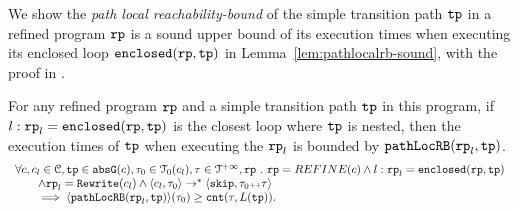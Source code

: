 We show the \emph{path local reachability-bound} of the simple transition path $\mathtt{tp}$ in a refined program $\mathtt{rp}$ is a sound upper bound of its execution times when executing its enclosed loop $\mathtt{enclosed}(\mathtt{rp}, \mathtt{tp})$ in Lemma~\ref{lem:pathlocalrb-sound}, with the proof in .
\begin{lem}
  \label{lem:pathlocalrb-sound}
  For any refined program $\mathtt{rp}$ and a simple transition path $\mathtt{tp}$ in this program,
  if $l: \mathtt{rp}_l = \mathtt{enclosed}(\mathtt{rp}, \mathtt{tp})$ is the closest loop where $\mathtt{tp}$ is nested,
  then the execution times of $\mathtt{tp}$ when executing the $\mathtt{rp}_l$ is bounded by $\mathtt{pathLocRB}(\mathtt{rp}_l, \mathtt{tp})$.
  \[
    \begin{array}{l}
    \forall c, c_l \in \mathcal{C}, \mathtt{tp} \in \mathtt{abs}{\mathtt{G}}(c), \mathtt{\tau}_0 \in \mathcal{T}_0(c_l), \mathtt{\tau} \in \mathcal{T}^{+\infty}, \mathtt{rp} ~.~ 
    \mathtt{rp} = REFINE(c)
    \land
    l: \mathtt{rp}_l = \mathtt{enclosed}(\mathtt{rp}, \mathtt{tp})
    \\ \qquad
    \land 
    \mathtt{rp}_l = \mathtt{Rewrite}(c_l)
    \land
    \langle c_l, \mathtt{\tau}_0 \rangle \to^* 
    \langle \mathtt{skip}, \mathtt{\tau}_0 {\scriptscriptstyle ++} \mathtt{\tau} \rangle
    \\ \qquad
    \implies
    \langle \mathtt{pathLocRB}(\mathtt{rp}_l, \mathtt{tp}) \rangle(\mathtt{\tau}_0) \geq \mathtt{cnt}(\mathtt{\tau}, L(\mathtt{tp})).
    \end{array}
  \]  
\end{lem}